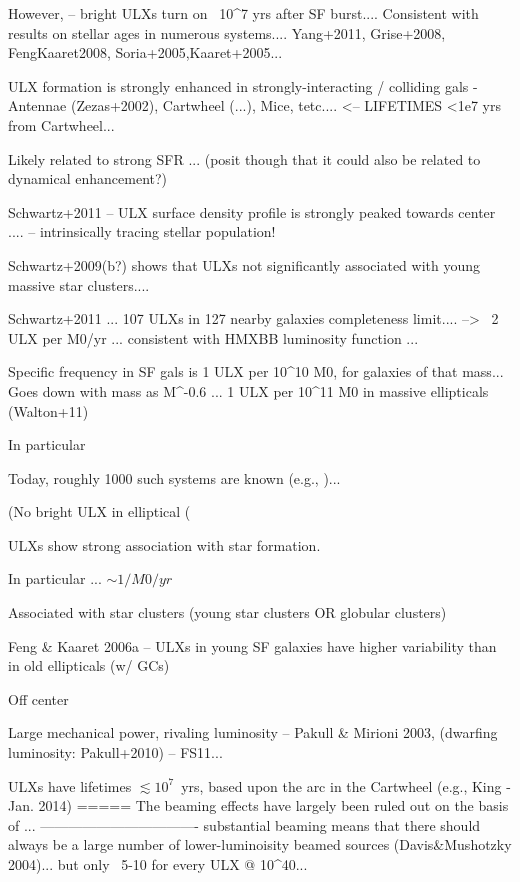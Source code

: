 However, \citet{Schwartz_2009} -- bright ULXs turn on ~10^7 yrs after SF burst.... Consistent with results on stellar ages in numerous systems....  Yang+2011, Grise+2008, FengKaaret2008, Soria+2005,Kaaret+2005...

ULX formation is strongly enhanced in strongly-interacting / colliding gals - Antennae (Zezas+2002), Cartwheel (...), Mice, tetc....    <-- LIFETIMES <1e7 yrs  from Cartwheel...

Likely related to strong SFR ... (posit though that it could also be related to dynamical enhancement?)


Schwartz+2011 -- ULX surface density profile is strongly peaked towards center .... -- intrinsically tracing stellar population!

Schwartz+2009(b?) shows that ULXs not significantly associated with young massive star clusters....

Schwartz+2011 ... 107 ULXs in 127 nearby galaxies completeness limit.... -->  ~2 ULX per  M0/yr  ... consistent with HMXBB luminosity function ...

Specific frequency in SF gals is 1 ULX per 10^10 M0, for galaxies of that mass...  Goes down with mass as M^-0.6 ...   1 ULX per 10^11 M0 in massive ellipticals (Walton+11)






In particular




Today, roughly 1000 such systems are known (e.g., \citep{Walton_2011,...2011s})...

(No bright ULX in elliptical (

ULXs show strong association with star formation.  

In particular ...
$\sim 1 / M0/yr$


Associated with star clusters (young star clusters OR globular clusters)

Feng & Kaaret 2006a -- ULXs in young SF galaxies have higher variability than in old ellipticals (w/ GCs)

Off center

Large mechanical power, rivaling luminosity -- Pakull & Mirioni 2003, (dwarfing luminosity: Pakull+2010) -- FS11...  

ULXs have lifetimes $\lesssim 10^7$~yrs, based upon the arc in the Cartwheel (e.g., King - Jan. 2014)
=====
The beaming effects have largely been ruled out on the basis of ...  
----------------------------------
substantial beaming means that there should always be a large number of lower-luminoisity beamed sources (Davis&Mushotzky 2004)... but only ~5-10 for every ULX @ 10^40...  

